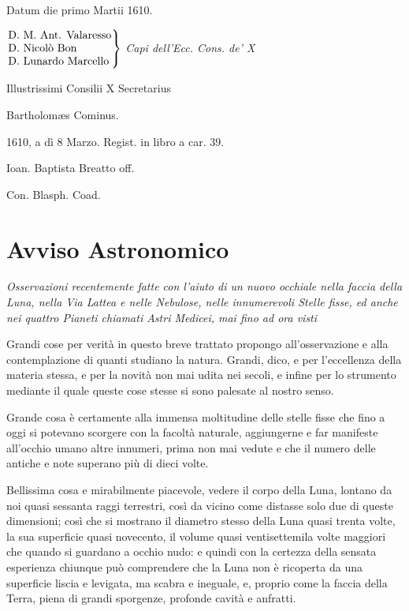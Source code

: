 \documentclass[11pt,twoside,openany]{book}
\begin{document}
Datum die primo Martii 1610.

\begin{center}
$\left.\begin{tabular}{@{}l@{}}
D. M. Ant. Valaresso \\
D. Nicolò Bon \\
D. Lunardo Marcello
\end{tabular}\right\}$ \textit{Capi dell'Ecc. Cons. de' X}
\end{center}

Illustrissimi Consilii X Secretarius

Bartholomæs Cominus.

1610, a dì 8 Marzo. Regist. in libro a car. 39.

Ioan. Baptista Breatto off.

Con. Blasph. Coad.

\chapter{Avviso Astronomico}
\begin{center}
{\itshape Osservazioni recentemente fatte con l'aiuto di un nuovo occhiale nella faccia della Luna, nella Via Lattea e nelle Nebulose, nelle innumerevoli Stelle fisse, ed anche nei quattro Pianeti chiamati Astri Medicei, mai fino ad ora visti\par}
\end{center}
\bigskip

Grandi cose per verità in questo breve trattato propongo all'osservazione e alla contemplazione di quanti studiano la natura. Grandi, dico, e per l'eccellenza della materia stessa, e per la novità non mai udita nei secoli, e infine per lo strumento mediante il quale queste cose stesse si sono palesate al nostro senso.

Grande cosa è certamente alla immensa moltitudine delle stelle fisse che fino a oggi si potevano scorgere con la facoltà naturale, aggiungerne e far manifeste all'occhio umano altre innumeri, prima non mai vedute e che il numero delle antiche e note superano più di dieci volte.

Bellissima cosa e mirabilmente piacevole, vedere il corpo della Luna, lontano da noi quasi sessanta raggi terrestri, così da vicino come distasse solo due di queste dimensioni; così che si mostrano il diametro stesso della Luna quasi trenta volte, la sua superficie quasi novecento, il volume quasi ventisettemila volte maggiori che quando si guardano a occhio nudo: e quindi con la certezza della sensata esperienza chiunque può comprendere che la Luna non è ricoperta da una superficie liscia e levigata, ma scabra e ineguale, e, proprio come la faccia della Terra, piena di grandi sporgenze, profonde cavità e anfratti.
\end{document}
